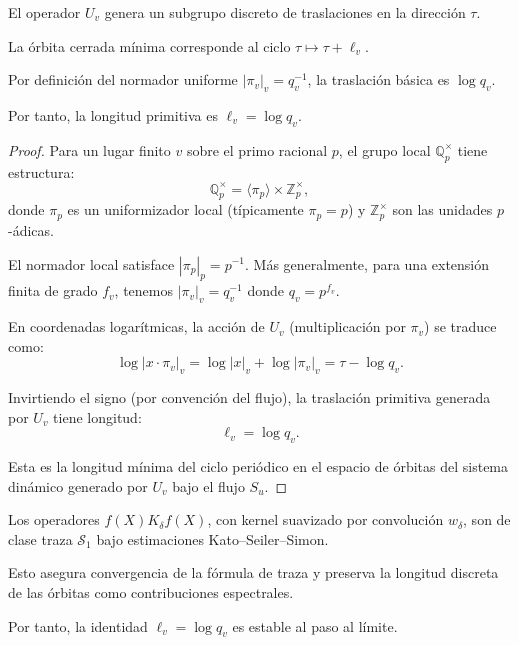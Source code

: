 \begin{lemma}\label{lem:orbitas-cerradas}
El operador $U_v$ genera un subgrupo discreto de traslaciones en la dirección $\tau$.

La órbita cerrada mínima corresponde al ciclo $\tau \mapsto \tau + \ell_v$.

Por definición del normador uniforme $|\pi_v|_v = q_v^{-1}$, la traslación básica es $\log q_v$.

Por tanto, la longitud primitiva es $\ell_v = \log q_v$.
\end{lemma}

\begin{proof}
Para un lugar finito $v$ sobre el primo racional $p$, el grupo local $\mathbb{Q}_p^\times$ tiene estructura:
\[
\mathbb{Q}_p^\times = \langle \pi_p \rangle \times \mathbb{Z}_p^\times,
\]
donde $\pi_p$ es un uniformizador local (típicamente $\pi_p = p$) y $\mathbb{Z}_p^\times$ son las unidades $p$-ádicas.

El normador local satisface $|\pi_p|_p = p^{-1}$. Más generalmente, para una extensión finita de grado $f_v$, tenemos $|\pi_v|_v = q_v^{-1}$ donde $q_v = p^{f_v}$.

En coordenadas logarítmicas, la acción de $U_v$ (multiplicación por $\pi_v$) se traduce como:
\[
\log |x \cdot \pi_v|_v = \log |x|_v + \log |\pi_v|_v = \tau - \log q_v.
\]

Invirtiendo el signo (por convención del flujo), la traslación primitiva generada por $U_v$ tiene longitud:
\[
\ell_v = \log q_v.
\]

Esta es la longitud mínima del ciclo periódico en el espacio de órbitas del sistema dinámico generado por $U_v$ bajo el flujo $S_u$.
\end{proof}

\begin{lemma}\label{lem:traza-estabilidad}
Los operadores $f(X) K_\delta f(X)$, con kernel suavizado por convolución $w_\delta$, son de clase traza $\mathcal{S}_1$ bajo estimaciones Kato--Seiler--Simon.

Esto asegura convergencia de la fórmula de traza y preserva la longitud discreta de las órbitas como contribuciones espectrales.

Por tanto, la identidad $\ell_v = \log q_v$ es estable al paso al límite.
\end{lemma}

